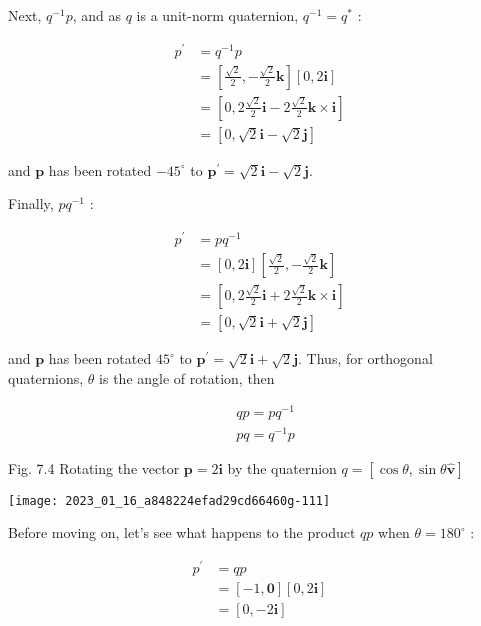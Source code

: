Next, $q^{-1} p$, and as $q$ is a unit-norm quaternion, $q^{-1}=q^{*}$ :

$$
\begin{aligned}
p^{\prime} & =q^{-1} p \\
& =\left[\frac{\sqrt{2}}{2},-\frac{\sqrt{2}}{2} \mathbf{k}\right][0,2 \mathbf{i}] \\
& =\left[0,2 \frac{\sqrt{2}}{2} \mathbf{i}-2 \frac{\sqrt{2}}{2} \mathbf{k} \times \mathbf{i}\right] \\
& =[0, \sqrt{2} \mathbf{i}-\sqrt{2} \mathbf{j}]
\end{aligned}
$$

and $\mathbf{p}$ has been rotated $-45^{\circ}$ to $\mathbf{p}^{\prime}=\sqrt{2} \mathbf{i}-\sqrt{2} \mathbf{j}$.

Finally, $p q^{-1}$ :

$$
\begin{aligned}
p^{\prime} & =p q^{-1} \\
& =[0,2 \mathbf{i}]\left[\frac{\sqrt{2}}{2},-\frac{\sqrt{2}}{2} \mathbf{k}\right] \\
& =\left[0,2 \frac{\sqrt{2}}{2} \mathbf{i}+2 \frac{\sqrt{2}}{2} \mathbf{k} \times \mathbf{i}\right] \\
& =[0, \sqrt{2} \mathbf{i}+\sqrt{2} \mathbf{j}]
\end{aligned}
$$

and $\mathbf{p}$ has been rotated $45^{\circ}$ to $\mathbf{p}^{\prime}=\sqrt{2} \mathbf{i}+\sqrt{2} \mathbf{j}$. Thus, for orthogonal quaternions, $\theta$ is the angle of rotation, then

$$
\begin{aligned}
& q p=p q^{-1} \\
& p q=q^{-1} p
\end{aligned}
$$

Fig. 7.4 Rotating the vector $\mathbf{p}=2 \mathbf{i}$ by the quaternion $q=[\cos \theta, \sin \theta \hat{\mathbf{v}}]$

\begin{center}
\texttt{[image: 2023\_01\_16\_a848224efad29cd66460g-111]}
\end{center}

Before moving on, let's see what happens to the product $q p$ when $\theta=180^{\circ}$ :

$$
\begin{aligned}
p^{\prime} & =q p \\
& =[-1, \mathbf{0}][0,2 \mathbf{i}] \\
& =[0,-2 \mathbf{i}]
\end{aligned}
$$

